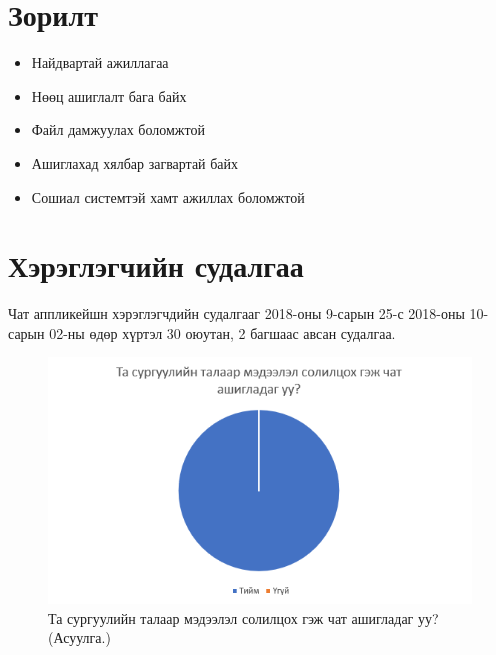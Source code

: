 \section{Зорилт}
\begin{itemize}
	\item Найдвартай ажиллагаа
	\item Нөөц ашиглалт бага байх
	\item Файл дамжуулах боломжтой
	\item Ашиглахад хялбар загвартай байх
	\item Сошиал системтэй хамт ажиллах боломжтой
\end{itemize}

\section{Хэрэглэгчийн судалгаа}
Чат аппликейшн хэрэглэгчдийн судалгааг 2018-оны 9-сарын 25-с 2018-оны 10-сарын 02-ны өдөр хүртэл 30 оюутан, 2 багшаас авсан судалгаа.
\begin{figure}[htbp]
	\centering
	\includegraphics[scale=0.5]{Chart/Chart1}
	\caption[Хэрэглэгчийн судалгаа]{Та сургуулийн талаар мэдээлэл солилцох гэж чат ашигладаг уу?(Асуулга.)}
	\label{fig:Chart1}
\end{figure}

